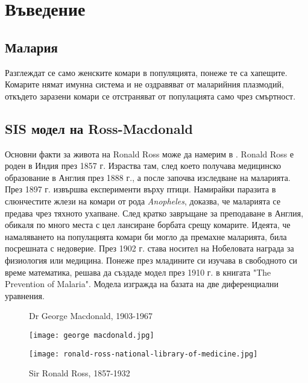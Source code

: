 \section{Въведение}
\subsection{Малария}
Разглеждат се само женските комари в популяцията, понеже те са хапещите.
Комарите нямат имунна система и не оздравяват от маларийния плазмодий, откъдето заразени комари се отстраняват от популацията само чрез смъртност.

\subsection{SIS модел на Ross-Macdonald}

Основни факти за живота на Ronald Ross може да намерим в \cite{Bacaer2011}.
Ronald Ross е роден в Индия през 1857 г.
Израства там, след което получава медицинско образование в Англия през 1888 г., а после започва изследване на маларията.
През 1897 г. извършва експерименти върху птици.
Намирайки паразита в слюнчестите жлези на комари от рода \textit{Anopheles}, доказва, че маларията се предава чрез тяхното ухапване.
След кратко завръщане за преподаване в Англия, обикаля по много места с цел лансиране борбата срещу комарите. Идеята, че намаляването на популацията комари би могло да премахне маларията, била посрешната с недоверие.
През 1902 г. става носител на Нобеловата награда за физиология или медицина.
Понеже през младините си изучава в свободното си време математика, решава да създаде модел през 1910 г. в книгата "The Prevention of Malaria". Модела изгражда на базата на две диференциални уравнения.



\begin{figure}[h]
  \centering
  \begin{minipage}{.5\textwidth}
    \caption{Dr George Macdonald, 1903-1967}
    \centering
    \texttt{[image: george macdonald.jpg]}
    \label{fig:Ross}
  \end{minipage}%
  \begin{minipage}{.5\textwidth}
    \caption{Sir Ronald Ross, 1857-1932}
    \centering
    \texttt{[image: ronald-ross-national-library-of-medicine.jpg]}
    \label{fig:Macdonald}
  \end{minipage}
\end{figure}

